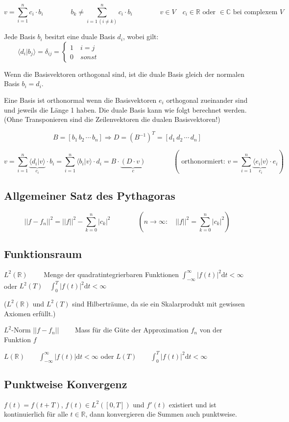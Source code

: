 \[  
	v = \sum_{i=1}^{n}c_i \cdot b_i \qquad \qquad  b_k \neq \sum_{i=1 \, (i\neq k)}^{n}c_i \cdot b_i \qquad \qquad v \in V \quad c_i \in \mathbb{R}\text{ oder } \in \mathbb{C} \text{ bei complexem $V$}
\]

Jede Basis $b_i$ besitzt eine duale Basis $d_i$, wobei gilt: $\qquad \langle d_i|b_j\rangle = \delta_{ij} = \begin{cases} 1 \quad i=j\\ 0 \quad sonst  \end{cases}$

Wenn die Basisvektoren orthogonal sind, ist die duale Basis gleich der normalen Basis $b_i = d_i$.

Eine Basis ist orthonormal wenn die Basisvektoren $e_i$ orthogonal zueinander sind und jeweils die Länge 1 haben. Die duale Basis kann wie folgt berechnet werden. (Ohne Transponieren sind die Zeilenvektoren die dualen Basisvektoren!)

\[  
	B = \left[ b_1 \, b_2 \, \cdots \, b_n \right] \Rightarrow D=(B^{-1})^T = \left[ d_1 \, d_2 \, \cdots \, d_n \right]
\]

\[
	v=\sum_{i=1}^{n} \underbrace{\langle d_i|v \rangle}_{c_i} \cdot b_i = \sum_{i=1}^{n} \langle b_i|v \rangle \cdot d_i = B \cdot \underbrace{(D \cdot v)}_{c}
	\qquad \qquad 
	\left( \text{ orthonormiert: } v=\sum_{i=1}^{n} \underbrace{\langle e_i|v \rangle}_{c_i} \cdot e_i \right) 
\]


\subsection{Allgemeiner Satz des Pythagoras}

\[  
	||f-f_n||^2 =  ||f||^2 - \sum_{k=0}^{n} |c_k|^2 \qquad \qquad \left( n\rightarrow \infty: \quad ||f||^2=\sum_{k=0}^{n} |c_k|^2 \right)
\]


\subsection{Funktionsraum}
$L^2(\mathbb{R}) \qquad$ Menge der quadratintegrierbaren Funktionen $\int_{-\infty}^{\infty}|f(t)|^2 \mathrm{d}t < \infty$ oder $L^2(T) \quad \int_{0}^{T}|f(t)|^2 \mathrm{d}t < \infty$

($L^2(\mathbb{R})$ und $L^2(T)$ sind Hilberträume, da sie ein Skalarprodukt mit gewissen Axiomen erfüllt.)

$L^2$-Norm $||f-f_n|| \qquad$ Mass für die Güte der Approximation $f_n$ von der Funktion $f$

$L(\mathbb{R}) \qquad \int_{-\infty}^{\infty}|f(t)| \mathrm{d}t < \infty$ oder $L(T) \qquad \int_{0}^{T}|f(t)|^2 \mathrm{d}t < \infty$

\subsection{Punktweise Konvergenz}
$f(t) = f(t+T)$, $f(t) \in L^2([0,T])$ und $f'(t)$ existiert und ist kontinuierlich für alle $t \in \mathbb{R}$, dann konvergieren die Summen auch punktweise.
